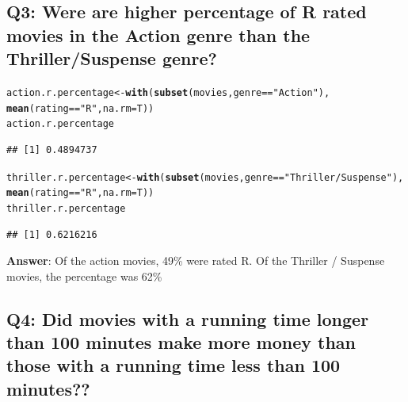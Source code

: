 \documentclass{tufte-book}\usepackage[]{graphicx}\usepackage[]{color}
\makeatletter
\newcommand{\hlstr}[1]{\textcolor[rgb]{0.192,0.494,0.8}{#1}}%
\newcommand{\hlopt}[1]{\textcolor[rgb]{0,0,0}{#1}}%
\newcommand{\hlstd}[1]{\textcolor[rgb]{0.345,0.345,0.345}{#1}}%
\newcommand{\hlkwb}[1]{\textcolor[rgb]{0.69,0.353,0.396}{#1}}%
\newcommand{\hlkwc}[1]{\textcolor[rgb]{0.333,0.667,0.333}{#1}}%
\newcommand{\hlkwd}[1]{\textcolor[rgb]{0.737,0.353,0.396}{\textbf{#1}}}%
\newenvironment{kframe}{%
 \def\at@end@of@kframe{}%
 \ifinner\ifhmode%
  \def\at@end@of@kframe{\end{minipage}}%
  \begin{minipage}{\columnwidth}%
 \fi\fi%
 \def\FrameCommand##1{\hskip\@totalleftmargin \hskip-\fboxsep
 \colorbox{shadecolor}{##1}\hskip-\fboxsep
     \hskip-\linewidth \hskip-\@totalleftmargin \hskip\columnwidth}%
 \MakeFramed {\advance\hsize-\width
   \@totalleftmargin\z@ \linewidth\hsize
   \@setminipage}}%
 {\par\unskip\endMakeFramed%
 \at@end@of@kframe}
\newenvironment{knitrout}{}{} %
\makeatother
\begin{document}
\subsection{Q3: Were are higher percentage of R rated movies in the Action genre than the Thriller/Suspense genre?}
\begin{knitrout}
\color{fgcolor}\begin{kframe}
\begin{alltt}
\hlstd{action.r.percentage} \hlkwb{<-} \hlkwd{with}\hlstd{(}\hlkwd{subset}\hlstd{(movies, genre} \hlopt{==} \hlstr{"Action"}\hlstd{),}
                            \hlkwd{mean}\hlstd{(rating} \hlopt{==} \hlstr{"R"}\hlstd{,} \hlkwc{na.rm} \hlstd{= T))}
\hlstd{action.r.percentage}
\end{alltt}
\begin{verbatim}
## [1] 0.4894737
\end{verbatim}
\begin{alltt}
\hlstd{thriller.r.percentage} \hlkwb{<-} \hlkwd{with}\hlstd{(}\hlkwd{subset}\hlstd{(movies, genre} \hlopt{==} \hlstr{"Thriller/Suspense"}\hlstd{),}
                              \hlkwd{mean}\hlstd{(rating} \hlopt{==} \hlstr{"R"}\hlstd{,} \hlkwc{na.rm} \hlstd{= T))}
\hlstd{thriller.r.percentage}
\end{alltt}
\begin{verbatim}
## [1] 0.6216216
\end{verbatim}
\end{kframe}
\end{knitrout}

\textbf{Answer}: Of the action movies, 49\% were rated R. Of the Thriller / Suspense movies, the percentage was 62\%

\subsection{Q4: Did movies with a running time longer than 100 minutes make more money than those with a running time less than 100 minutes??}
\end{document}
